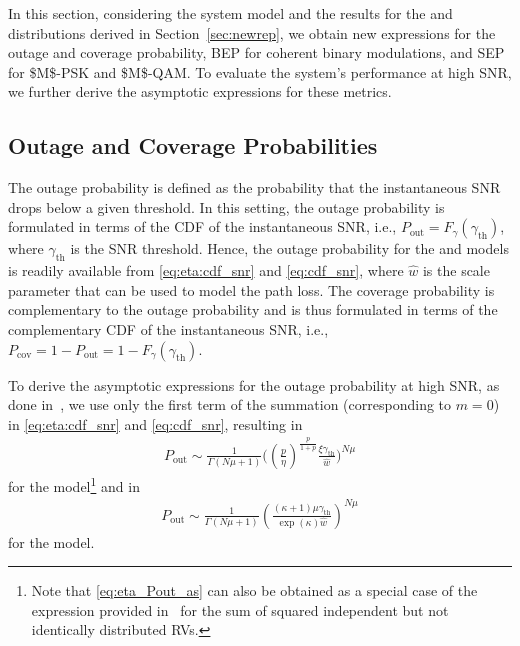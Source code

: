 \documentclass[journal,twocolumn]{IEEEtran}
\begin{document}
In this section, considering the system model and the results for the \Ehm{} and \km{} distributions derived in Section~\ref{sec:newrep}, we obtain new expressions for the outage and coverage probability, \ac{BEP} for coherent binary modulations, and \ac{SEP} for \ac{$M$-PSK} and \ac{$M$-QAM}. To evaluate the system's performance at high \ac{SNR}, we further derive the asymptotic expressions for these metrics.


\subsection{Outage and Coverage Probabilities}

The outage probability is defined as the probability that the instantaneous \ac{SNR} drops below a given threshold. In this setting, the outage probability is formulated in terms of the \ac{CDF} of the instantaneous \ac{SNR}, i.e., $P_\textrm{out} = F_{\gamma}(\gamma_\textrm{th})$, where $\gamma_\textrm{th}$ is the \ac{SNR} threshold. Hence, the outage probability for the \Ehm{} and \km{} models is readily available from \eqref{eq:eta:cdf_snr} and \eqref{eq:cdf_snr}, where $\hat{w}$ is the scale parameter that can be used to model the path loss. The coverage probability is complementary to the outage probability and is thus formulated in terms of the complementary \ac{CDF} of the instantaneous \ac{SNR}, i.e., $P_\textrm{cov} = 1 - P_\textrm{out} = 1- F_{\gamma}(\gamma_\textrm{th})$.

To derive the asymptotic expressions for the outage probability at high \ac{SNR}, as done in~\cite{Alm23b}, we use only the first term of the summation (corresponding to $m=0$) in \eqref{eq:eta:cdf_snr} and \eqref{eq:cdf_snr}, resulting in
\begin{align} \label{eq:eta_Pout_as}
     P_{\textrm{out}} \sim \frac{1}{\Gamma (N \mu  +1)} \bigg(\left(\frac{p}{\eta }\right)^{\frac{p}{1+p}} \frac{\xi \gamma_\textrm{th}}{\hat{w}} \bigg)^{N\mu}
\end{align}
for the \Ehm{} model\footnote{Note that \eqref{eq:eta_Pout_as} can also be obtained as a special case of the expression provided in~\cite{Bad21} for the sum of squared independent but not identically distributed \Ehm{} \acp{RV}.} and in
\begin{align} \label{eq:kappa_Pout_as}
    P_{\textrm{out}} \sim \frac{1}{\Gamma (N \mu  +1)} \left(\frac{(\kappa +1) \mu \gamma_\textrm{th}}{\exp(\kappa) \hat{w}}\right)^{N \mu }
\end{align}
for the \km{} model.
\end{document}
